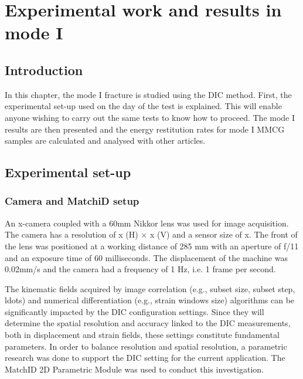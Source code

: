\chapter{Experimental work and results in mode I}
\label{Chapter3}

\section{Introduction}

In this chapter, the mode I fracture is studied using the DIC method. First, the experimental set-up used on the day of the test is explained. This will enable anyone wishing to carry out the same tests to know how to proceed. The mode I results are then presented and the energy restitution rates for mode I MMCG samples are calculated and analysed with other articles.

\section{Experimental set-up}

\subsection{Camera and MatchiD setup}
An x-camera coupled with a 60mm Nikkor lens was used for image acquisition. The camera has a resolution of x (H) × x (V) and a sensor size of x. The front of the lens was positioned at a working distance of 285 mm with an aperture of f/11 and an exposure time of 60 milliseconds. The displacement of the machine was 0.02mm/s and the camera had a frequency of 1 Hz, i.e. 1 frame per second.

The kinematic fields acquired by image correlation (e.g., subset size, subset step, ldots) and numerical differentiation (e.g., strain windows size) algorithms can be significantly impacted by the DIC configuration settings. Since they will determine the spatial resolution and accuracy linked to the DIC measurements, both in displacement and strain fields, these settings constitute fundamental parameters.  In order to balance resolution and spatial resolution, a parametric research was done to support the DIC setting for the current application. The MatchID 2D Parametric Module was used to conduct this investigation.

